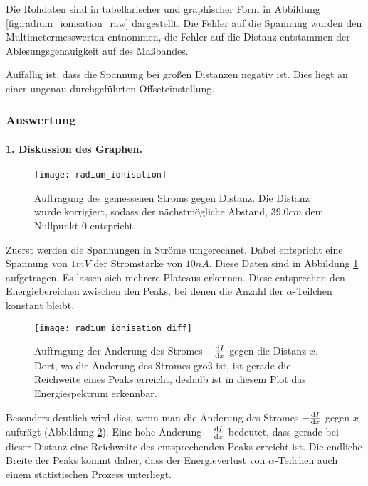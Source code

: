 \documentclass{../Misc/MontavonLaTeX/Montavon}
\newcommand{\fullwidth}{1.0\textwidth}
\begin{document}
Die Rohdaten sind in tabellarischer und graphischer Form in Abbildung \ref{fig:radium_ionisation_raw} dargestellt. Die Fehler auf die Spannung wurden den Multimetermesswerten entnommen, die Fehler auf die Distanz entstammen der Ablesungsgenauigkeit auf des Maßbandes.

Auffällig ist, dass die Spannung bei großen Distanzen negativ ist. Dies liegt an einer ungenau durchgeführten Offseteinstellung. 

\subsubsection{Auswertung}
\paragraph{1. Diskussion des Graphen.}

\begin{figure}[htbp]
\centering
\texttt{[image: radium\_ionisation]}
\caption{Auftragung des gemessenen Stroms gegen Distanz. Die Distanz wurde korrigiert, sodass der nächstmögliche Abstand, $39.0 \unit{cm}$ dem Nullpunkt $0$ entspricht.}
\label{fig:radium_ionisation}
\end{figure}

Zuerst werden die Spannungen in Ströme umgerechnet. Dabei entspricht eine Spannung von $1 \unit{mV}$ der Stromstärke von $10 \unit{nA}$. Diese Daten sind in Abbildung \ref{fig:radium_ionisation} aufgetragen. Es lassen sich mehrere Plateaus erkennen. Diese entsprechen den Energiebereichen zwischen den Peaks, bei denen die Anzahl der $\alpha$-Teilchen konstant bleibt. 

\begin{figure}[htbp]
\centering
\texttt{[image: radium\_ionisation\_diff]}
\caption{Auftragung der Änderung des Stromes $- \frac{\mathrm d I}{\mathrm d x}$ gegen die Distanz $x$. Dort, wo die Änderung des Stromes groß ist, ist gerade die Reichweite eines Peaks erreicht, deshalb ist in diesem Plot das Energiespektrum erkennbar.}
\label{fig:radium_ionisation_diff}
\end{figure}

Besonders deutlich wird dies, wenn man die Änderung des Stromes $- \frac{\mathrm d I}{\mathrm d x}$ gegen $x$ aufträgt (Abbildung \ref{fig:radium_ionisation_diff}). Eine hohe Änderung $- \frac{\mathrm d I}{\mathrm d x}$ bedeutet, dass gerade bei dieser Distanz eine Reichweite des entsprechenden Peaks erreicht ist. Die endliche Breite der Peaks kommt daher, dass der Energieverlust von $\alpha$-Teilchen auch einem statistischen Prozess unterliegt.
\end{document}
